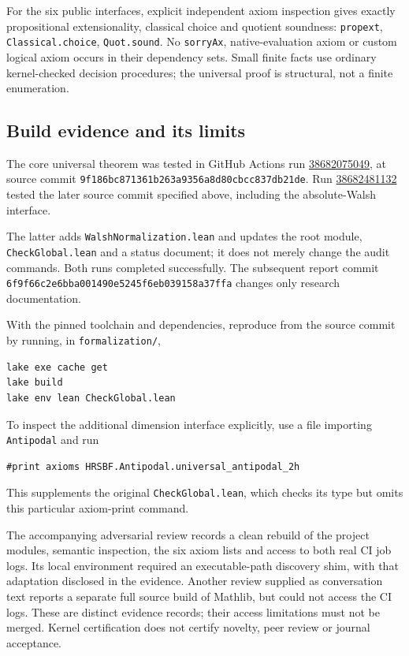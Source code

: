 \documentclass[11pt,a4paper]{article}
\theoremstyle{remark}
\theoremstyle{plain}
\begin{document}
For the six public interfaces, explicit independent axiom inspection gives exactly propositional extensionality, classical choice and quotient soundness: \nolinkurl{propext}, \nolinkurl{Classical.choice}, \nolinkurl{Quot.sound}. No \nolinkurl{sorryAx}, native-evaluation axiom or custom logical axiom occurs in their dependency sets. Small finite facts use ordinary kernel-checked decision procedures; the universal proof is structural, not a finite enumeration.

\subsection{Build evidence and its limits}
The core universal theorem was tested in GitHub Actions run \href{https://github.com/contatofilipevono-rgb/hrsbf-bent-verification/actions/runs/38682075049}{38682075049}, at source commit \nolinkurl{9f186bc871361b263a9356a8d80cbcc837db21de}. Run \href{https://github.com/contatofilipevono-rgb/hrsbf-bent-verification/actions/runs/38682481132}{38682481132} tested the later source commit specified above, including the absolute-Walsh interface.

The latter adds \nolinkurl{WalshNormalization.lean} and updates the root module, \nolinkurl{CheckGlobal.lean} and a status document; it does not merely change the audit commands. Both runs completed successfully. The subsequent report commit \nolinkurl{6f9f66c2e6bba001490e5245f6eb039158a37ffa} changes only research documentation.

With the pinned toolchain and dependencies, reproduce from the source commit by running, in \nolinkurl{formalization/},
\begin{verbatim}
lake exe cache get
lake build
lake env lean CheckGlobal.lean
\end{verbatim}
To inspect the additional dimension interface explicitly, use a file importing \nolinkurl{Antipodal} and run
\begin{verbatim}
#print axioms HRSBF.Antipodal.universal_antipodal_2h
\end{verbatim}
This supplements the original \nolinkurl{CheckGlobal.lean}, which checks its type but omits this particular axiom-print command.

The accompanying adversarial review records a clean rebuild of the project modules, semantic inspection, the six axiom lists and access to both real CI job logs. Its local environment required an executable-path discovery shim, with that adaptation disclosed in the evidence. Another review supplied as conversation text reports a separate full source build of Mathlib, but could not access the CI logs. These are distinct evidence records; their access limitations must not be merged. Kernel certification does not certify novelty, peer review or journal acceptance.
\end{document}
